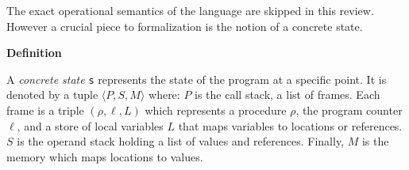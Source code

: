 The exact operational semantics of the language are skipped in this review. However a crucial piece to formalization is the notion of a concrete state.

\noindent\textbf{Definition}

A \textit{concrete state} \lstinline{s} represents the state of the program at a specific point. It is denoted by a tuple \(\langle P, S, M \rangle\) where: \(P\) is the call stack, a list of frames. Each frame is a triple $(\rho, \ell, L)$ which represents a procedure \(\rho\), the program counter $\ell$, and a store of local variables \(L\) that maps variables to locations or references. \(S\) is the operand stack holding a list of values and references. Finally, \(M\) is the memory which maps locations to values.
